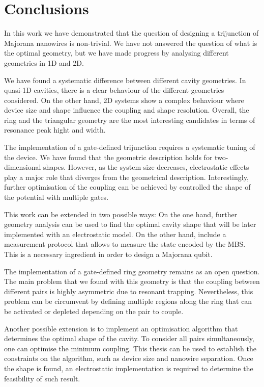 \chapter{Conclusions}

In this work we have demonstrated that the question of designing a trijunction of Majorana nanowires is non-trivial.
We have not answered the question of what is the optimal geometry, but we have made progress by analysing different geometries in 1D and 2D.

We have found a systematic difference between different cavity geometries.
In quasi-1D cavities, there is a clear behaviour of the different geometries considered.
On the other hand, 2D systems show a complex behaviour where device size and shape influence the coupling and shape resolution.
Overall, the ring and the triangular geometry are the most interesting candidates in terms of resonance peak hight and width.

The implementation of a gate-defined trijunction requires a systematic tuning of the device.
We have found that the geometric description holds for two-dimensional shapes.
However, as the system size decreases, electrostatic effects play a major role that diverges from the geometrical description.
Interestingly, further optimisation of the coupling can be achieved by controlled the shape of the potential with multiple gates.

This work can be extended in two possible ways:
On the one hand, further geometry analysis can be used to find the optimal cavity shape that will be later implemented with an electrostatic model.
On the other hand, include a measurement protocol that allows to measure the state encoded by the MBS.
This is a necessary ingredient in order to design a Majorana qubit.

The implementation of a gate-defined ring geometry remains as an open question.
The main problem that we found with this geometry is that the coupling between different pairs is highly asymmetric due to resonant trapping.
Nevertheless, this problem can be circumvent by defining multiple regions along the ring that can be activated or depleted depending on the pair to couple.

Another possible extension is to implement an optimisation algorithm that determines the optimal shape of the cavity.
To consider all pairs simultaneously, one can optimise the minimum coupling.
This thesis can be used to establish the constraints on the algorithm, such as device size and nanowire separation.
Once the shape is found, an electrostatic implementation is required to determine the feasibility of such result.

